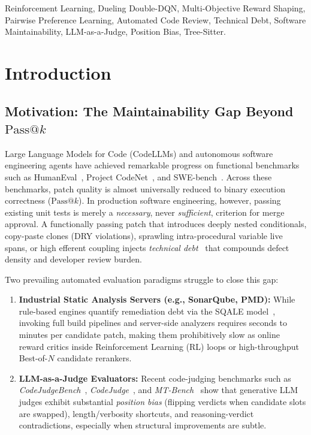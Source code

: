 \documentclass[conference]{IEEEtran}
\begin{document}
\begin{IEEEkeywords}
Reinforcement Learning, Dueling Double-DQN, Multi-Objective Reward Shaping, Pairwise Preference Learning, Automated Code Review, Technical Debt, Software Maintainability, LLM-as-a-Judge, Position Bias, Tree-Sitter.
\end{IEEEkeywords}

\section{Introduction}
\label{sec:intro}

\subsection{Motivation: The Maintainability Gap Beyond $\text{Pass@}k$}
Large Language Models for Code (CodeLLMs) and autonomous software engineering agents have achieved remarkable progress on functional benchmarks such as HumanEval~\cite{chen2021codex}, Project CodeNet~\cite{puri2021codenet}, and SWE-bench~\cite{jimenez2024swebench}. Across these benchmarks, patch quality is almost universally reduced to binary execution correctness ($\text{Pass@}k$). In production software engineering, however, passing existing unit tests is merely a \emph{necessary}, never \emph{sufficient}, criterion for merge approval. A functionally passing patch that introduces deeply nested conditionals, copy-paste clones (DRY violations), sprawling intra-procedural variable live spans, or high efferent coupling injects \emph{technical debt}~\cite{letouzey2012sqale, campbell2018cognitive} that compounds defect density and developer review burden.

Two prevailing automated evaluation paradigms struggle to close this gap:
\begin{enumerate}
    \item \textbf{Industrial Static Analysis Servers (e.g., SonarQube, PMD):} While rule-based engines quantify remediation debt via the SQALE model~\cite{letouzey2012sqale}, invoking full build pipelines and server-side analyzers requires seconds to minutes per candidate patch, making them prohibitively slow as online reward critics inside Reinforcement Learning (RL) loops or high-throughput Best-of-$N$ candidate rerankers.
    \item \textbf{LLM-as-a-Judge Evaluators:} Recent code-judging benchmarks such as \textit{CodeJudgeBench}~\cite{codejudgebench2025}, \textit{CodeJudge}~\cite{tong2024codejudge}, and \textit{MT-Bench}~\cite{zheng2023judging} show that generative LLM judges exhibit substantial \emph{position bias} (flipping verdicts when candidate slots are swapped), length/verbosity shortcuts, and reasoning-verdict contradictions, especially when structural improvements are subtle.
\end{enumerate}
\end{document}

